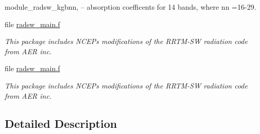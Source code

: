 \begin{DoxyCompactItemize}
\begin{DoxyCompactList}
\begin{DoxyEnumerate}
\item \textquotesingle{}module\+\_\+radsw\+\_\+kgbnn\textquotesingle{}, -- absorption coefficents for 14 bands, where nn =16-\/29. 
\end{DoxyEnumerate}\end{DoxyCompactList}\item 
file \hyperlink{radsw__main_8f}{radsw\+\_\+main.\+f}
\begin{DoxyCompactList}\small\item\em This package includes N\+C\+EP\textquotesingle{}s modifications of the R\+R\+T\+M-\/\+SW radiation code from A\+ER inc. \end{DoxyCompactList}\item 
file \hyperlink{radsw__main_8f}{radsw\+\_\+main.\+f}
\begin{DoxyCompactList}\small\item\em This package includes N\+C\+EP\textquotesingle{}s modifications of the R\+R\+T\+M-\/\+SW radiation code from A\+ER inc. \end{DoxyCompactList}\end{DoxyCompactItemize}


\subsection{Detailed Description}
